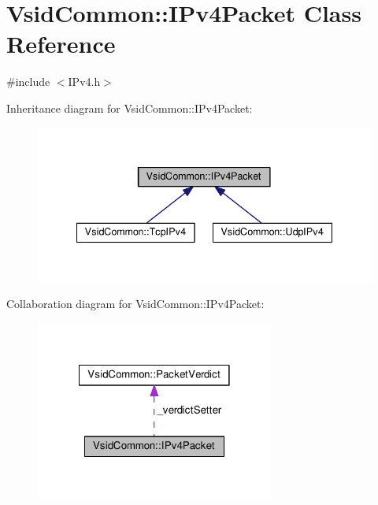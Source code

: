 \hypertarget{class_vsid_common_1_1_i_pv4_packet}{\section{Vsid\-Common\-:\-:I\-Pv4\-Packet Class Reference}
\label{class_vsid_common_1_1_i_pv4_packet}
}


{\ttfamily \#include $<$I\-Pv4.\-h$>$}



Inheritance diagram for Vsid\-Common\-:\-:I\-Pv4\-Packet\-:
\nopagebreak
\begin{figure}[H]
\begin{center}
\leavevmode
\includegraphics[width=337pt]{class_vsid_common_1_1_i_pv4_packet__inherit__graph}
\end{center}
\end{figure}


Collaboration diagram for Vsid\-Common\-:\-:I\-Pv4\-Packet\-:
\nopagebreak
\begin{figure}[H]
\begin{center}
\leavevmode
\includegraphics[width=222pt]{class_vsid_common_1_1_i_pv4_packet__coll__graph}
\end{center}
\end{figure}
